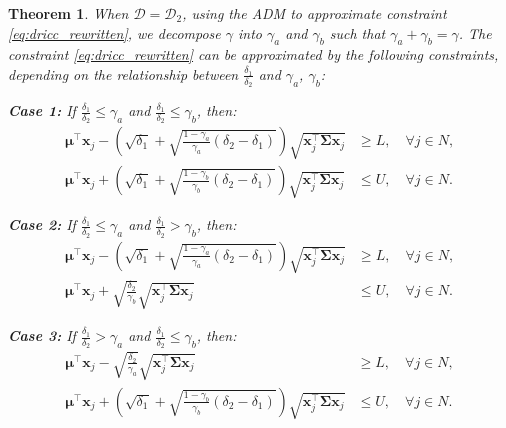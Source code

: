 \documentclass[preprint,12pt,authoryear]{elsarticle}
\newtheorem{theorem}{Theorem}
\begin{document}
\begin{theorem}\label{thm:dricc_d2_adm}
When $\mathcal{D} = \mathcal{D}_2$, using the ADM to approximate constraint \eqref{eq:dricc_rewritten}, we decompose $\gamma$ into $\gamma_a$ and $\gamma_b$ such that $\gamma_a + \gamma_b = \gamma$. The constraint \eqref{eq:dricc_rewritten} can be approximated by the following constraints, depending on the relationship between $\frac{\delta_1}{\delta_2}$ and $\gamma_a$, $\gamma_b$:

\textbf{Case 1:} If $\frac{\delta_1}{\delta_2} \leqslant \gamma_a$ and $\frac{\delta_1}{\delta_2} \leqslant \gamma_b$, then:
\begin{align}
\boldsymbol{\mu}^\top \mathbf{x}_j - \left(\sqrt{\delta_1} + \sqrt{\frac{1 - \gamma_a}{\gamma_a} (\delta_2 - \delta_1)}\right) \sqrt{\mathbf{x}_j^\top \boldsymbol{\Sigma} \mathbf{x}_j} &\geqslant L, \quad \forall j \in N, \label{eq:dricc_d2_adm_case1_lower} \\
\boldsymbol{\mu}^\top \mathbf{x}_j + \left(\sqrt{\delta_1} + \sqrt{\frac{1 - \gamma_b}{\gamma_b} (\delta_2 - \delta_1)}\right) \sqrt{\mathbf{x}_j^\top \boldsymbol{\Sigma} \mathbf{x}_j} &\leqslant U, \quad \forall j \in N. \label{eq:dricc_d2_adm_case1_upper}
\end{align}

\textbf{Case 2:} If $\frac{\delta_1}{\delta_2} \leqslant \gamma_a$ and $\frac{\delta_1}{\delta_2} > \gamma_b$, then:
\begin{align}
\boldsymbol{\mu}^\top \mathbf{x}_j - \left(\sqrt{\delta_1} + \sqrt{\frac{1 - \gamma_a}{\gamma_a} (\delta_2 - \delta_1)}\right) \sqrt{\mathbf{x}_j^\top \boldsymbol{\Sigma} \mathbf{x}_j} &\geqslant L, \quad \forall j \in N, \label{eq:dricc_d2_adm_case2_lower} \\
\boldsymbol{\mu}^\top \mathbf{x}_j + \sqrt{\frac{\delta_2}{\gamma_b}} \sqrt{\mathbf{x}_j^\top \boldsymbol{\Sigma} \mathbf{x}_j} &\leqslant U, \quad \forall j \in N. \label{eq:dricc_d2_adm_case2_upper}
\end{align}

\textbf{Case 3:} If $\frac{\delta_1}{\delta_2} > \gamma_a$ and $\frac{\delta_1}{\delta_2} \leqslant \gamma_b$, then:
\begin{align}
\boldsymbol{\mu}^\top \mathbf{x}_j - \sqrt{\frac{\delta_2}{\gamma_a}} \sqrt{\mathbf{x}_j^\top \boldsymbol{\Sigma} \mathbf{x}_j} &\geqslant L, \quad \forall j \in N, \label{eq:dricc_d2_adm_case3_lower} \\
\boldsymbol{\mu}^\top \mathbf{x}_j + \left(\sqrt{\delta_1} + \sqrt{\frac{1 - \gamma_b}{\gamma_b} (\delta_2 - \delta_1)}\right) \sqrt{\mathbf{x}_j^\top \boldsymbol{\Sigma} \mathbf{x}_j} &\leqslant U, \quad \forall j \in N. \label{eq:dricc_d2_adm_case3_upper}
\end{align}


\end{theorem}
\end{document}
